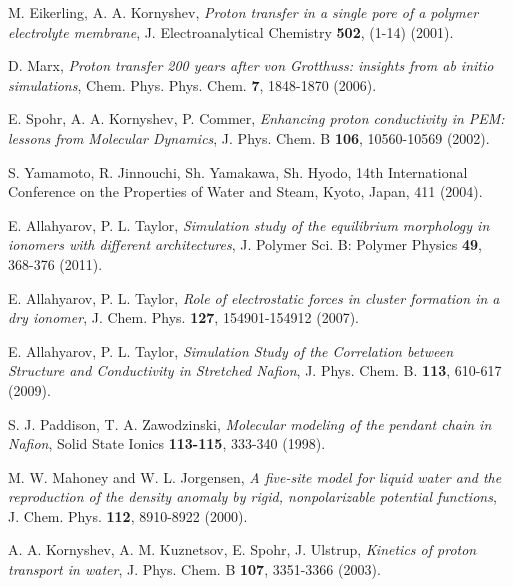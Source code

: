 \documentclass[3p,english,preprint]{elsarticle}
\begin{document}
\begin{thebibliography}{00}
M. Eikerling, A. A. Kornyshev, 
{\it Proton transfer in a single pore of a polymer electrolyte membrane}, 
J. Electroanalytical Chemistry {\bf 502}, (1-14) (2001).

 D. Marx, 
{\it Proton transfer 200 years after von Grotthuss: insights from ab initio simulations}, 
Chem. Phys. Phys. Chem. {\bf 7}, 1848-1870 (2006).



E. Spohr, A. A. Kornyshev, P. Commer,
{\it Enhancing proton conductivity in PEM: lessons from Molecular Dynamics}, 
J. Phys. Chem. B {\bf 106}, 10560-10569 (2002).




 S. Yamamoto, R. Jinnouchi, Sh. Yamakawa, Sh. Hyodo,
  14th  International Conference on the Properties of Water and Steam,
  Kyoto, Japan,  411 (2004). 


E. Allahyarov, P.  L. Taylor, 
{\it Simulation study of the equilibrium morphology in 
ionomers with different architectures}, 
J. Polymer Sci. B: Polymer Physics {\bf 49}, 368-376 (2011).




 E. Allahyarov, P. L. Taylor, 
{\it Role of electrostatic forces in cluster formation in a dry ionomer},
 J. Chem. Phys. {\bf 127}, 154901-154912 (2007). 





E. Allahyarov, P.  L. Taylor, 
{\it Simulation Study of the Correlation between Structure 
 and Conductivity in Stretched Nafion}, 
J. Phys. Chem. B. {\bf 113}, 610-617 (2009).




S. J. Paddison, T. A. Zawodzinski,
{\it Molecular modeling of the pendant chain in Nafion},  
Solid State Ionics {\bf 113-115}, 333-340 (1998). 




 M. W. Mahoney and W. L. Jorgensen,
{\it A five-site model for liquid water and the reproduction of the density anomaly by rigid, nonpolarizable potential functions},
J. Chem. Phys. {\bf 112},  8910-8922  (2000).


A. A. Kornyshev, A. M. Kuznetsov, E. Spohr, J. Ulstrup, 
 {\it  Kinetics of proton transport in water}, 
J. Phys. Chem. B {\bf 107}, 3351-3366 (2003).





\end{thebibliography}
\end{document}
